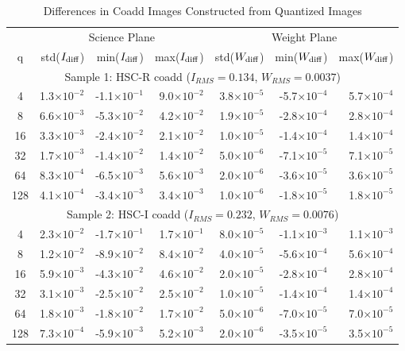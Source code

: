 \begin{table}
\caption{Differences in Coadd Images Constructed from Quantized Images}
\centering
\begin{tabular}[]{c|rrr|rrr}
\hline
          &  \multicolumn{3}{c}{Science Plane} & \multicolumn{3}{c}{Weight Plane} \\
 q        &  std($I_{\rm diff}$) & min($I_{\rm diff}$) & max($I_{\rm diff}$) & std($W_{\rm diff}$) & min($W_{\rm diff}$) & max($W_{\rm diff}$) \\
\hline
\multicolumn{7}{c}{Sample 1: HSC-R coadd ($I_{RMS}=0.134$, $W_{RMS}=0.0037$)}  \\
\hline
  4    &  1.3$\times 10^{-2}$ & -1.1$\times 10^{-1}$ & 9.0$\times 10^{-2}$ &  3.8$\times 10^{-5}$ & -5.7$\times 10^{-4}$ & 5.7$\times 10^{-4}$ \\ 
  8    &  6.6$\times 10^{-3}$ & -5.3$\times 10^{-2}$ & 4.2$\times 10^{-2}$ &  1.9$\times 10^{-5}$ & -2.8$\times 10^{-4}$ & 2.8$\times 10^{-4}$ \\
  16   &  3.3$\times 10^{-3}$ & -2.4$\times 10^{-2}$ & 2.1$\times 10^{-2}$ &  1.0$\times 10^{-5}$ & -1.4$\times 10^{-4}$ & 1.4$\times 10^{-4}$ \\
  32   &  1.7$\times 10^{-3}$ & -1.4$\times 10^{-2}$ & 1.4$\times 10^{-2}$ &  5.0$\times 10^{-6}$ & -7.1$\times 10^{-5}$ & 7.1$\times 10^{-5}$ \\
  64   &  8.3$\times 10^{-4}$ & -6.5$\times 10^{-3}$ & 5.6$\times 10^{-3}$ &  2.0$\times 10^{-6}$ & -3.6$\times 10^{-5}$ & 3.6$\times 10^{-5}$ \\
  128  &  4.1$\times 10^{-4}$ & -3.4$\times 10^{-3}$ & 3.4$\times 10^{-3}$ &  1.0$\times 10^{-6}$ & -1.8$\times 10^{-5}$ & 1.8$\times 10^{-5}$ \\
\hline 
\multicolumn{7}{c}{Sample 2: HSC-I coadd ($I_{RMS}=0.232$, $W_{RMS}=0.0076$)}  \\
\hline
  4    &  2.3$\times 10^{-2}$ & -1.7$\times 10^{-1}$ & 1.7$\times 10^{-1}$ &  8.0$\times 10^{-5}$ & -1.1$\times 10^{-3}$ & 1.1$\times 10^{-3}$ \\
  8    &  1.2$\times 10^{-2}$ & -8.9$\times 10^{-2}$ & 8.4$\times 10^{-2}$ &  4.0$\times 10^{-5}$ & -5.6$\times 10^{-4}$ & 5.6$\times 10^{-4}$ \\
  16   &  5.9$\times 10^{-3}$ & -4.3$\times 10^{-2}$ & 4.6$\times 10^{-2}$ &  2.0$\times 10^{-5}$ & -2.8$\times 10^{-4}$ & 2.8$\times 10^{-4}$ \\
  32   &  3.1$\times 10^{-3}$ & -2.5$\times 10^{-2}$ & 2.5$\times 10^{-2}$ &  1.0$\times 10^{-5}$ & -1.4$\times 10^{-4}$ & 1.4$\times 10^{-4}$ \\
  64   &  1.8$\times 10^{-3}$ & -1.8$\times 10^{-2}$ & 1.7$\times 10^{-2}$ &  5.0$\times 10^{-6}$ & -7.0$\times 10^{-5}$ & 7.0$\times 10^{-5}$ \\
  128  &  7.3$\times 10^{-4}$ & -5.9$\times 10^{-3}$ & 5.2$\times 10^{-3}$ &  2.0$\times 10^{-6}$ & -3.5$\times 10^{-5}$ & 3.5$\times 10^{-5}$ \\
\hline
\end{tabular}
\label{tab_agg_image_stat}
\end{table}

